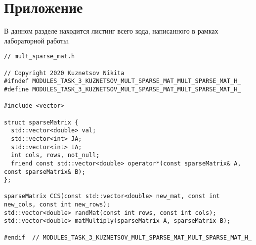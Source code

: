 \documentclass{report}
\begin{document}
\section*{Приложение}
В данном разделе находится листинг всего кода, написанного в рамках лабораторной работы.
\begin{lstlisting}
// mult_sparse_mat.h

// Copyright 2020 Kuznetsov Nikita
#ifndef MODULES_TASK_3_KUZNETSOV_MULT_SPARSE_MAT_MULT_SPARSE_MAT_H_
#define MODULES_TASK_3_KUZNETSOV_MULT_SPARSE_MAT_MULT_SPARSE_MAT_H_

#include <vector>

struct sparseMatrix {
  std::vector<double> val;
  std::vector<int> JA;
  std::vector<int> IA;
  int cols, rows, not_null;
  friend const std::vector<double> operator*(const sparseMatrix& A, const sparseMatrix& B);
};

sparseMatrix CCS(const std::vector<double> new_mat, const int new_cols, const int new_rows);
std::vector<double> randMat(const int rows, const int cols);
std::vector<double> matMultiply(sparseMatrix A, sparseMatrix B);

#endif  // MODULES_TASK_3_KUZNETSOV_MULT_SPARSE_MAT_MULT_SPARSE_MAT_H_


\end{lstlisting}
\end{document}
